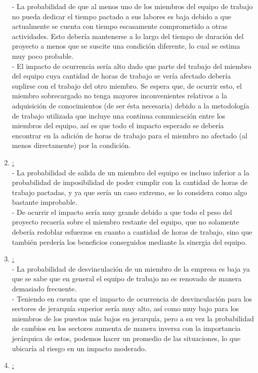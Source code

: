 \documentclass[a4paper, 12pt,twoside]{report}  %
\numberwithin{equation}{subsection} %
\begin{document}
\begin{enumerate}
	- La probabilidad de que al menos uno de los miembros del equipo de trabajo no pueda dedicar el tiempo pactado a sus labores es baja debido a que actualmente se cuenta con tiempo escasamente comprometido a otras actividades. Esto debería mantenerse a lo largo del tiempo de duración del proyecto a menos que se suscite una condición diferente, lo cual se estima muy poco probable.\\
	- El impacto de ocurrencia sería alto dado que parte del trabajo del miembro del equipo cuya cantidad de horas de trabajo se vería afectado debería suplirse con el trabajo del otro miembro. Se espera que, de ocurrir esto, el miembro sobrecargado no tenga mayores inconvenientes relativos a la adquisición de conocimientos (de ser ésta necesaria) debido a la metodología de trabajo utilizada que incluye una continua comunicación entre los miembros del equipo, así es que todo el impacto esperado se debería encontrar en la adición de horas de trabajo para el miembro no afectado (al menos directamente) por la condición.
	\item \underline{:}\\
	- La probabilidad de salida de un miembro del equipo es incluso inferior a la probabilidad de imposibilidad de poder cumplir con la cantidad de horas de trabajo pactadas, y ya que sería un caso extremo, se lo considera como algo bastante improbable.\\
	- De ocurrir el impacto sería muy grande debido a que todo el peso del proyecto recaería sobre el miembro restante del equipo, que no solamente debería redoblar esfuerzos en cuanto a cantidad de horas de trabajo, sino que también perdería los beneficios conseguidos mediante la sinergia del equipo.
	\item \underline{:}\\
	- La probabilidad de desvinculación de un miembro de la empresa es baja ya que se sabe que en general el equipo de trabajo no es renovado de manera demasiado frecuente.\\
	- Teniendo en cuenta que el impacto de ocurrencia de desvinculación para los sectores de jerarquía superior sería muy alto, así como muy bajo para los miembros de los puestos más bajos en jerarquía, pero a su vez la probabilidad de cambios en los sectores aumenta de manera inversa con la importancia jerárquica de estos, podemos hacer un promedio de las situaciones, lo que ubicaría al riesgo en un impacto moderado.
	\item \underline{:}\\

\end{enumerate}
\end{document}
